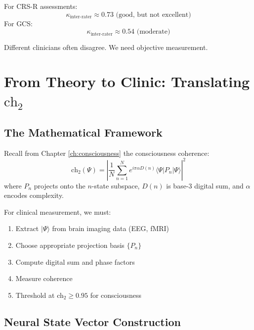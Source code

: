 \begin{theorem}\label{thm:interrater}
For CRS-R assessments:
\begin{equation}
\kappa_{\text{inter-rater}} \approx 0.73 \text{ (good, but not excellent)}
\end{equation}
For GCS:
\begin{equation}
\kappa_{\text{inter-rater}} \approx 0.54 \text{ (moderate)}
\end{equation}
\end{theorem}

Different clinicians often disagree. We need objective measurement.

\section{From Theory to Clinic: Translating \texorpdfstring{$\text{ch}_2$}{ch\_2}}

\subsection{The Mathematical Framework}

Recall from Chapter \ref{ch:consciousness} the consciousness coherence:
\begin{equation}
\text{ch}_2(\Psi) = \left|\frac{1}{N} \sum_{n=1}^{N} e^{i\pi\alpha D(n)} \langle \Psi | P_n | \Psi \rangle\right|^2
\end{equation}
where $P_n$ projects onto the $n$-state subspace, $D(n)$ is base-3 digital sum, and $\alpha$ encodes complexity.

For clinical measurement, we must:
\begin{enumerate}
\item Extract $|\Psi\rangle$ from brain imaging data (EEG, fMRI)
\item Choose appropriate projection basis $\{P_n\}$
\item Compute digital sum and phase factors
\item Measure coherence
\item Threshold at ch$_2 \geq 0.95$ for consciousness
\end{enumerate}

\subsection{Neural State Vector Construction}

